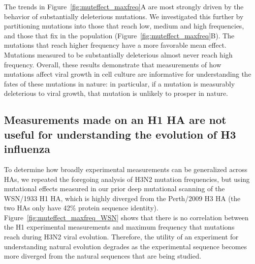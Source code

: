 \documentclass[9pt,twocolumn,twoside]{pnas-new-for-biorxiv}
\begin{document}
The trends in Figure~\ref{fig:muteffect_maxfreq}A are most strongly driven by the behavior of substantially deleterious mutations.
We investigated this further by partitioning mutations into those that reach low, medium and high frequencies, and those that fix in the population (Figure~\ref{fig:muteffect_maxfreq}B).
The mutations that reach higher frequency have a more favorable mean effect.
Mutations measured to be substantially deleterious almost never reach high frequency.
Overall, these results demonstrate that measurements of how mutations affect viral growth in cell culture are informative for understanding the fates of these mutations in nature: in particular, if a mutation is measurably deleterious to viral growth, that mutation is unlikely to prosper in nature.

\subsection*{Measurements made on an H1 HA are not useful for understanding the evolution of H3 influenza}
To determine how broadly experimental measurements can be generalized across HAs, we repeated the foregoing analysis of H3N2 mutation frequencies, but using mutational effects measured in our prior deep mutational scanning of the WSN/1933 H1 HA, which is highly diverged from the Perth/2009 H3 HA (the two HAs only have 42\% protein sequence identity).
Figure~\ref{fig:muteffect_maxfreq_WSN} shows that there is no correlation between the H1 experimental measurements and maximum frequency that mutations reach during H3N2 viral evolution.
Therefore, the utility of an experiment for understanding natural evolution degrades as the experimental sequence becomes more diverged from the natural sequences that are being studied.
\end{document}

